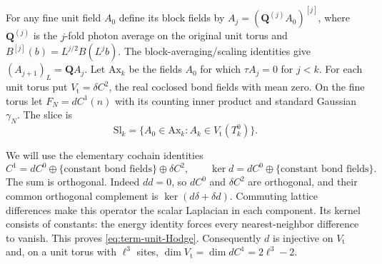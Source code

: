 For any fine unit field $A_0$ define its block fields by
$A_j=(\mathbf Q^{(j)}A_0)^{[j]}$, where $\mathbf Q^{(j)}$
is the $j$-fold photon average on the original unit torus and
$B^{[j]}(b)=L^{j/2}B(L^jb)$.
The block-averaging/scaling identities give
$(A_{j+1})_L=\mathbf QA_j$.
Let $\mathrm{Ax}_k$ be the fields $A_0$ for which
$\tau A_j=0$ for $j<k$.
For each unit torus put
$V_{\mathrm t}=\delta C^2$, the real coclosed bond
fields with mean zero.
On the fine torus let $F_N=dC^1(n)$ with its
counting inner product and standard Gaussian
$\gamma_N$. The slice is
\[
 \mathrm{Sl}_k=\{A_0\in\mathrm{Ax}_k:A_k\in V_{\mathrm t}(T_k^0)\}.
\]

We will use the elementary cochain identities
\begin{equation}\label{eq:term-unit-Hodge}
 C^1=dC^0\oplus\{\text{constant bond fields}\}\oplus\delta C^2,
       \qquad \ker d=dC^0\oplus\{\text{constant bond fields}\}.
\end{equation}
The sum is orthogonal. Indeed $dd=0$, so $dC^0$
and $\delta C^2$ are orthogonal, and their common
orthogonal complement is $\ker(d\delta+\delta d)$.
Commuting lattice differences make this operator
the scalar Laplacian in each component.
Its kernel consists of constants: the energy identity
forces every nearest-neighbor difference to vanish.
This proves \eqref{eq:term-unit-Hodge}.
Consequently $d$ is injective on $V_{\mathrm t}$ and,
on a unit torus with $\ell^3$ sites,
$\dim V_{\mathrm t}=\dim dC^1=2\ell^3-2$.


